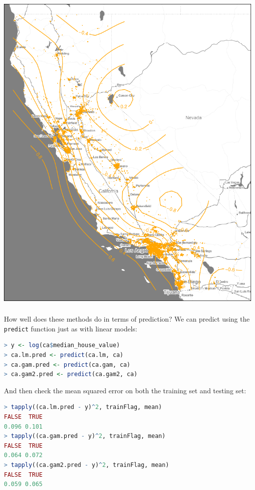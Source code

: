 \documentclass[xetex,mathserif,serif,aspectratio=169]{beamer}
\begin{document}
\begin{frame}[fragile] \frametitle{} \oldB \small

\begin{center}
\includegraphics[height=\textheight]{img/fig03.pdf}
\end{center}

\end{frame}

\begin{frame}[fragile] \frametitle{} \oldB \small

How well does these methods do in terms of prediction? We can
predict using the \texttt{predict} function just as with linear
models:
\begin{lstlisting}[language=R, basicstyle=\ttfamily]
> y <- log(ca$median_house_value)
> ca.lm.pred <- predict(ca.lm, ca)
> ca.gam.pred <- predict(ca.gam, ca)
> ca.gam2.pred <- predict(ca.gam2, ca)
\end{lstlisting}
And then check the mean squared error on both the
training set and testing set:
\begin{lstlisting}[language=R, basicstyle=\ttfamily]
> tapply((ca.lm.pred - y)^2, trainFlag, mean)
FALSE  TRUE
0.096 0.101
> tapply((ca.gam.pred - y)^2, trainFlag, mean)
FALSE  TRUE
0.064 0.072
> tapply((ca.gam2.pred - y)^2, trainFlag, mean)
FALSE  TRUE
0.059 0.065
\end{lstlisting}

\end{frame}
\end{document}
